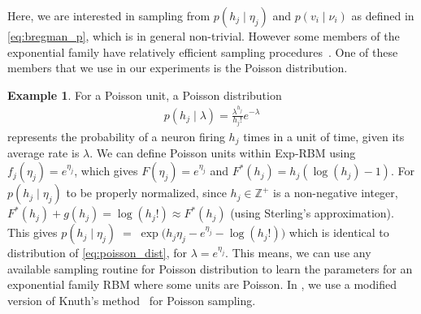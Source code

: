 \documentclass[twoside]{article}
\theoremstyle{plain}
\theoremstyle{definition}
\newtheorem{example}{Example}[section]
\theoremstyle{remark}
\newcommand{\refEq}[1]{\cref{#1}}%
\newcommand{\boldit}[1]{\ensuremath{#1}}
\newcommand{\sfit}[1]{\ensuremath{#1}}
\newcommand{\xx}[0]{\ensuremath{\boldit{v}}}%
\newcommand{\x}[0]{\ensuremath{{v}}}%
\newcommand{\y}[0]{\ensuremath{{h}}}%
\newcommand{\WW}[0]{\ensuremath{\boldit{W}}}%
\newcommand{\pp}[0]{\ensuremath{\sfit{p}}}%
\newcommand{\ff}[0]{\ensuremath{\sfit{f}}}%
\newcommand{\FF}[0]{\ensuremath{\sfit{F}}}%
\newcommand{\gh}[0]{\ensuremath{\sfit{g}}}%
\begin{document}
Here, we are interested in sampling from  $\pp(\y_j \mid \eta_j)$ and $\pp(\x_i \mid \nu_i)$ as defined in \refEq{eq:bregman_p}, which is in general non-trivial. 
 However some members of the exponential family have relatively efficient sampling procedures~\citep{ahrens1974computer}. %
One of these members that we use in our experiments is the Poisson distribution.
\begin{mdframed}[style=MyFrame]
\begin{example} \label{ex:poisson}
  For a Poisson unit, a Poisson distribution 
  \begin{align}
    \label{eq:poisson_dist}
    \pp(\y_j \mid \lambda) = \frac{\lambda^{\y_j}}{\y_j!} e^{-\lambda}  
  \end{align}
  represents the probability of a neuron firing $\y_j$ times in a unit of time, given its average rate 
is $\lambda$. %
  We can define Poisson units within Exp-RBM using $\ff_j(\eta_j) = e^{\eta_j}$, which gives $\FF(\eta_j) = e^{\eta_j}$ and 
  $\FF^*(\y_j) = \y_j (\log(\y_j) - 1)$. For $\pp(\y_j \mid \eta_j)$ to be properly normalized, since $\y_j \in \mathbb{Z}^+$ is a non-negative integer,   
  $\FF^*(\y_j) + \gh(\y_j) = \log(\y_j!) \approx \FF^*(\y_j)$ (using Sterling's approximation). This gives 
    $\pp(\y_j \mid \eta_j) \; = \; \exp \big ( \y_j\eta_j - e^{\eta_j} -  \log(\y_j!) \big)$
  which is identical to distribution of \refEq{eq:poisson_dist}, for $\lambda = e^{\eta_j}$. 
This means, we can use any available sampling routine for Poisson
  distribution to learn the parameters for an exponential family RBM where some units are Poisson.
In , we use a modified version of Knuth's method~\citep{knuth1969seminumerical} for Poisson sampling.
\end{example}
\end{mdframed}
\end{document}
